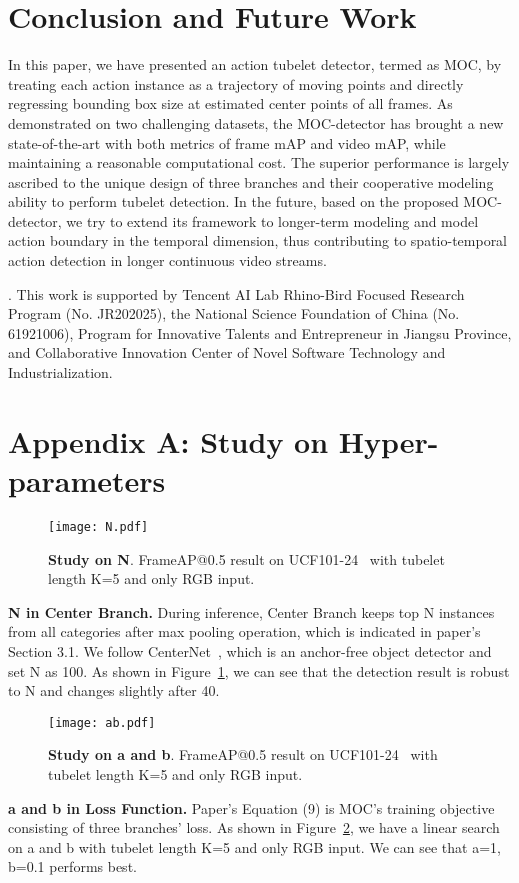 \documentclass[runningheads]{llncs}
\begin{document}
\section{Conclusion and Future Work}
In this paper, we have presented an action tubelet detector, termed as MOC, by treating each action instance as a trajectory of moving points and directly regressing bounding box size at estimated center points of all frames. As demonstrated on two challenging datasets, the MOC-detector has brought a new state-of-the-art with both metrics of frame mAP and video mAP, while maintaining a reasonable computational cost. The superior performance is largely ascribed to the unique design of three branches and their cooperative modeling ability to perform tubelet detection. In the future, based on the proposed MOC-detector, we try to extend its framework to longer-term modeling and model action boundary in the temporal dimension, thus contributing to spatio-temporal action detection in longer continuous video streams.

. This work is supported by Tencent AI Lab Rhino-Bird Focused Research Program (No. JR202025), the National Science Foundation of China (No. 61921006), Program for Innovative Talents and Entrepreneur in Jiangsu Province, and Collaborative Innovation Center of Novel Software Technology and Industrialization.

\section*{Appendix A: Study on Hyper-parameters}\label{A}
\begin{figure}
    \centering
      \texttt{[image: N.pdf]}
      \caption{{\bf Study on N}. FrameAP@0.5 result on UCF101-24~\cite{UCF101} with tubelet length K=5 and only RGB input.}
    \label{fig:N}
\end{figure}

\noindent\textbf{N in Center Branch.}
During inference, Center Branch keeps top N instances from all categories after max pooling operation, which is indicated in paper's Section 3.1. We follow CenterNet~\cite{CenterNet}, which is an anchor-free object detector and set N as 100.
As shown in Figure~\ref{fig:N}, we can see that the detection result is robust to N and changes slightly after 40.


\begin{figure}
    \centering
      \texttt{[image: ab.pdf]}
      \caption{{\bf Study on a and b}. FrameAP@0.5 result on UCF101-24~\cite{UCF101} with tubelet length K=5 and only RGB input.
      }
    \label{fig:ab}
\end{figure}
\noindent\textbf{a and b in Loss Function.}
Paper's Equation (9) is MOC’s training objective consisting of three branches’ loss. As shown in Figure~\ref{fig:ab}, we have a linear search on a and b with tubelet length K=5 and only RGB input. We can see that a=1, b=0.1 performs best.
\end{document}
